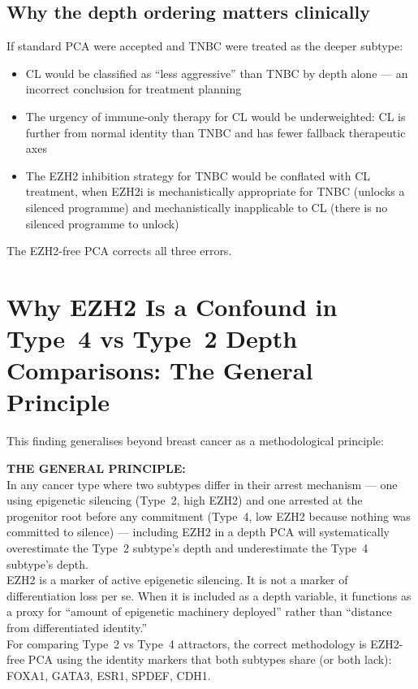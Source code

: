 \documentclass[12pt, a4paper]{article}
\begin{document}
\subsection{Why the depth ordering matters
clinically}

If standard PCA were accepted and TNBC were
treated as the deeper subtype:

\begin{itemize}
    \item CL would be classified as ``less
    aggressive'' than TNBC by depth alone ---
    an incorrect conclusion for treatment
    planning
    \item The urgency of immune-only therapy
    for CL would be underweighted: CL is
    further from normal identity than TNBC
    and has fewer fallback therapeutic axes
    \item The EZH2 inhibition strategy for
    TNBC would be conflated with CL treatment,
    when EZH2i is mechanistically appropriate
    for TNBC (unlocks a silenced programme)
    and mechanistically inapplicable to CL
    (there is no silenced programme to unlock)
\end{itemize}

The EZH2-free PCA corrects all three errors.

\section{Why EZH2 Is a Confound in Type~4 vs
Type~2 Depth Comparisons: The General Principle}

This finding generalises beyond breast cancer
as a methodological principle:

\begin{center}
\colorbox{mechanismbox}{
\begin{minipage}{0.88\textwidth}
\vspace{0.5em}
\textbf{THE GENERAL PRINCIPLE:}\\[0.4em]
In any cancer type where two subtypes differ
in their arrest mechanism --- one using
epigenetic silencing (Type~2, high EZH2)
and one arrested at the progenitor root before
any commitment (Type~4, low EZH2 because
nothing was committed to silence) --- including
EZH2 in a depth PCA will systematically
overestimate the Type~2 subtype's depth and
underestimate the Type~4 subtype's depth.\\[0.4em]
EZH2 is a marker of active epigenetic silencing.
It is not a marker of differentiation loss per se.
When it is included as a depth variable, it
functions as a proxy for ``amount of epigenetic
machinery deployed'' rather than ``distance from
differentiated identity.''\\[0.4em]
For comparing Type~2 vs Type~4 attractors, the
correct methodology is EZH2-free PCA using the
identity markers that both subtypes share
(or both lack): FOXA1, GATA3, ESR1, SPDEF, CDH1.
\vspace{0.5em}
\end{minipage}}
\end{center}
\end{document}

